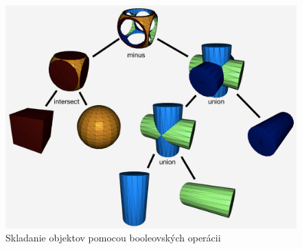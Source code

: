 \begin{figure}[H]
	\centering
	\includegraphics[width=\textwidth]{obrazky-figures/cube-sphere-cylinders-csg-tree.jpg}
	\caption{Skladanie objektov pomocou booleovských operácii}
	\label{fig:BooleanOperation}
\end{figure}






















































